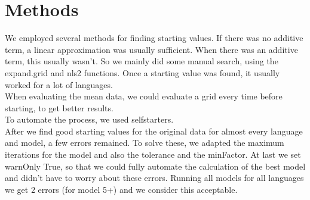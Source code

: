 \documentclass[paper=a4, fontsize=11pt]{scrartcl} %
\begin{document}
\section{Methods}
We employed several methods for finding starting values. If there was no additive term, a linear approximation was usually sufficient. When there was an additive term, this usually wasn't. So we mainly did some manual search, using the expand.grid and nls2 functions. Once a starting value was found, it usually worked for a lot of languages.\\
When evaluating the mean data, we could evaluate a grid every time before starting, to get better results.\\
To automate the process, we used selfstarters.\\

After we find good starting values for the original data for almost every language and model, a few errors remained. To solve these, we adapted the maximum iterations for the model and also the tolerance and the minFactor. At last we set warnOnly True, so that we could fully automate the calculation of the best model and didn't have to worry about these errors. Running all models for all languages we get $2$ errors (for model 5+) and we consider this acceptable.
\end{document}
